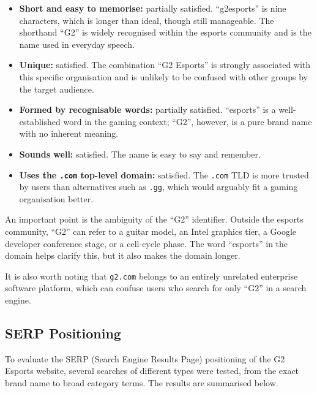 \documentclass[12pt, a4paper]{article}
\begin{document}
\begin{itemize}[noitemsep]
  \item \textbf{Short and easy to memorise:} partially satisfied. ``g2esports'' is nine characters, which is longer than ideal, though still manageable. The shorthand ``G2'' is widely recognised within the esports community and is the name used in everyday speech.
  \item \textbf{Unique:} satisfied. The combination ``G2 Esports'' is strongly associated with this specific organisation and is unlikely to be confused with other groups by the target audience.
  \item \textbf{Formed by recognisable words:} partially satisfied. ``esports'' is a well-established word in the gaming context; ``G2'', however, is a pure brand name with no inherent meaning.
  \item \textbf{Sounds well:} satisfied. The name is easy to say and remember.
  \item \textbf{Uses the \texttt{.com} top-level domain:} satisfied. The \texttt{.com} TLD is more trusted by users than alternatives such as \texttt{.gg}, which would arguably fit a gaming organisation better.
\end{itemize}

An important point is the ambiguity of the ``G2'' identifier. Outside the esports community, ``G2'' can refer to a guitar model, an Intel graphics tier, a Google developer conference stage, or a cell-cycle phase. The word ``esports'' in the domain helps clarify this, but it also makes the domain longer.

It is also worth noting that \texttt{g2.com} belongs to an entirely unrelated enterprise software platform, which can confuse users who search for only ``G2'' in a search engine.

\subsection{SERP Positioning}

To evaluate the SERP (Search Engine Results Page) positioning of the G2 Esports website, several searches of different types were tested, from the exact brand name to broad category terms. The results are summarised below.
\end{document}
